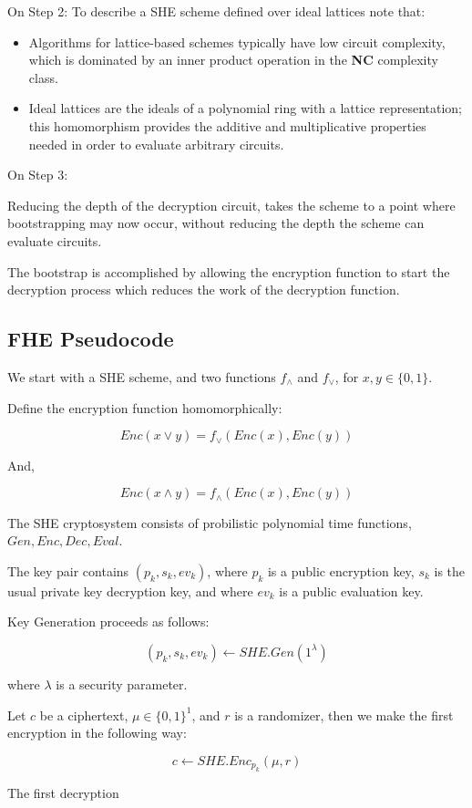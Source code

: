 
\begin{nt}{On Step 2:}
	To describe a SHE scheme defined over ideal lattices note that:
		\begin{itemize}
			\item Algorithms for lattice-based schemes typically have low circuit complexity, which is dominated by an inner product operation in the \textbf{NC} complexity class.
			\item Ideal lattices are the ideals of a polynomial ring with a lattice representation; this homomorphism provides the additive and multiplicative properties needed in order to evaluate arbitrary circuits.
        \end{itemize}
\end{nt}

\begin{nt}{On Step 3:}

Reducing the depth of the decryption circuit, takes the scheme to a point where bootstrapping may now occur, without reducing the depth the scheme can evaluate circuits.

The bootstrap is accomplished by allowing the encryption function to start the decryption process which reduces the work of the decryption function. 
\end{nt}


\subsection{FHE Pseudocode}

We start with a SHE scheme, and two functions $f_{\wedge}$ and $f_{\vee}$, for  $x,y \in \{0,1\}$.

Define the encryption function homomorphically:

\[Enc(x \vee y) = f_{\vee}(Enc(x),Enc(y))\]

And,

\[Enc(x \wedge y) = f_{\wedge}(Enc(x),Enc(y))\]

The SHE cryptosystem consists of probilistic polynomial time functions, $Gen, Enc, Dec, Eval$.

The key pair contains $(p_{k}, s_{k}, ev_{k})$, where $p_{k}$ is a public encryption key, $s_{k}$ is the usual private key decryption key, and where $ev_{k}$ is a public evaluation key.

Key Generation proceeds as follows:

\[(p_{k},s_{k},ev_{k}) \leftarrow SHE.Gen(1^{\lambda})\]

where $\lambda$ is a security parameter. 


Let $c$ be a ciphertext, $\mu \in \{0,1\}^{1}$, and $r$ is a randomizer, then we make the first encryption in the following way:

\[c \leftarrow SHE.Enc_{p_{k}}(\mu,r)\] 


The first decryption 



